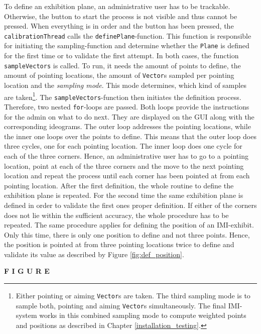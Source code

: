 To define an exhibition plane, an administrative user has to be trackable. Otherwise, the button to start the process is not visible and thus cannot be pressed. When everything is in order and the button has been pressed, the \texttt{calibrationThread} calls the \texttt{definePlane}-function. This function is responsible for initiating the sampling-function and determine whether the \texttt{Plane} is defined for the first time or to validate the first attempt. In both cases, the function \texttt{sampleVectors} is called. To run, it needs the amount of points to define, the amount of pointing locations, the amount of \texttt{Vector}s sampled per pointing location and the \textit{sampling mode}. This mode determines, which kind of samples are taken\footnote{Either pointing or aiming \texttt{Vector}s are taken. The third sampling mode is to sample both, pointing and aiming \texttt{Vector}s simultaneously. The final \ac{IMI}-system works in this combined sampling mode to compute weighted points and positions as described in Chapter \ref{installation_testing}.}. The \texttt{sampleVectors}-function then initiates the definition process. Therefore, two nested \texttt{for}-loops are passed. Both loops provide the instructions for the admin on what to do next. They are displayed on the \ac{GUI} along with the corresponding ideograms. The outer loop addresses the pointing locations, while the inner one loops over the points to define. This means that the outer loop does three cycles, one for each pointing location. The inner loop does one cycle for each of the three corners. Hence, an administrative user has to go to a pointing location, point at each of the three corners and the move to the next pointing location and repeat the process until each corner has been pointed at from each pointing location. After the first definition, the whole routine to define the exhibition plane is repeated. For the second time the same exhibition plane is defined in order to validate the first ones proper definition. If either of the corners does not lie within the sufficient accuracy, the whole procedure has to be repeated. The same procedure applies for defining the position of an \ac{IMI}-exhibit. Only this time, there is only one position to define and not three points. Hence, the position is pointed at from three pointing locations twice to define and validate its value as described by Figure \ref{fig:def_position}.

\textbf{F I G U R E}

